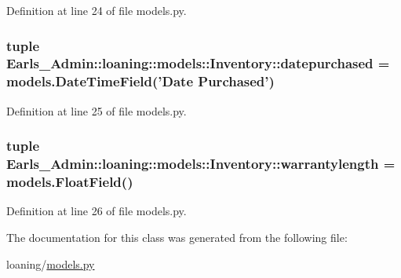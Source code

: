 Definition at line 24 of file models.py.\hypertarget{classEarls__Admin_1_1loaning_1_1models_1_1Inventory_e493e8119541f509f4d0c901619ac228}{
\subsubsection[datepurchased]{\setlength{\rightskip}{0pt plus 5cm}tuple {\bf Earls\_\-Admin::loaning::models::Inventory::datepurchased} = models.DateTimeField('Date Purchased')}}
\label{classEarls__Admin_1_1loaning_1_1models_1_1Inventory_e493e8119541f509f4d0c901619ac228}




Definition at line 25 of file models.py.\hypertarget{classEarls__Admin_1_1loaning_1_1models_1_1Inventory_f013c3e241c3c2fa87307d61aebd39de}{
\subsubsection[warrantylength]{\setlength{\rightskip}{0pt plus 5cm}tuple {\bf Earls\_\-Admin::loaning::models::Inventory::warrantylength} = models.FloatField()}}
\label{classEarls__Admin_1_1loaning_1_1models_1_1Inventory_f013c3e241c3c2fa87307d61aebd39de}




Definition at line 26 of file models.py.

The documentation for this class was generated from the following file:\begin{CompactItemize}
\item 
loaning/\hyperlink{loaning_2models_8py}{models.py}\end{CompactItemize}

